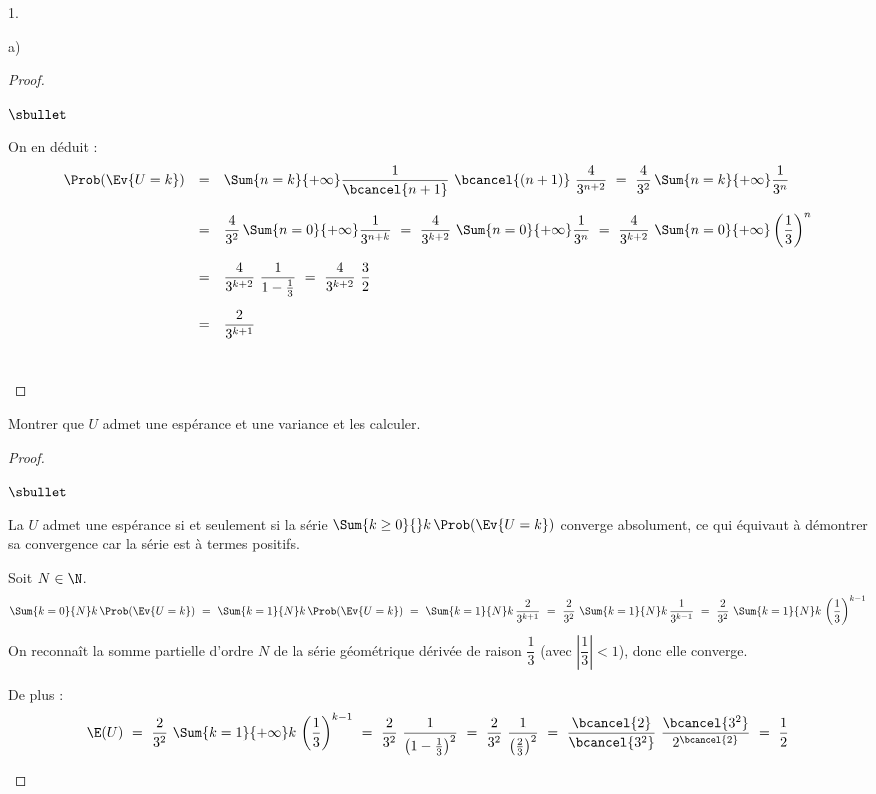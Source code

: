 \begin{noliste}{1.}
\begin{noliste}{a)}
\begin{proof}
\begin{noliste}{$\sbullet$}
      
      On en déduit :
      \[
       \begin{array}{rcl}
        \Prob(\Ev{U=k}) & = &  \Sum{n=k}{+\infty} \dfrac{1}{\bcancel{n+1}}
        \ \bcancel{(n+1)} \ \dfrac{4}{3^{n+2}}
        \ = \ \dfrac{4}{3^2} \, \Sum{n=k}{+\infty} \dfrac{1}{3^n}
        \\[.6cm]
        & = &  \dfrac{4}{3^2} \, \Sum{n=0}{+\infty} \dfrac{1}{3^{n+k}}
        \ = \ \dfrac{4}{3^{k+2}} \ \Sum{n=0}{+\infty}
        \dfrac{1}{3^n}
        \ = \ \dfrac{4}{3^{k+2}} \ \Sum{n=0}{+\infty} \left(
        \dfrac{1}{3}\right)^n
        \\[.6cm]
        & = &  \dfrac{4}{3^{k+2}} \ \dfrac{1}{1- \frac{1}{3}} \ = \
        \dfrac{4}{3^{k+2}} \ \dfrac{3}{2}
        \\[.6cm]
        & = &  \dfrac{2}{3^{k+1}}
       \end{array}
      \]
      ~\\[-1.2cm]
     \end{noliste}
    \end{proof}
    
    \item Montrer que $U$ admet une espérance et une variance et les 
    calculer.
    
    \begin{proof}~
      \begin{noliste}{$\sbullet$}
	\item La \var $U$ admet une espérance si et seulement si la 
	série $\Sum{k\geq 0}{} k \, \Prob(\Ev{U=k})$ converge 
	absolument,
	ce qui équivaut à démontrer sa convergence car la série est 
	à termes positifs.
	
	\item Soit $N\in \N$.
	\[
	  \Sum{k=0}{N} k \, \Prob(\Ev{U=k}) \ = \
	  \Sum{k=1}{N} k \, \Prob(\Ev{U=k}) \ = \
	  \Sum{k=1}{N} k \, \dfrac{2}{3^{k+1}} \ = \
	  \dfrac{2}{3^2} \ \Sum{k=1}{N} k \, \dfrac{1}{3^{k-1}} \ = \
	  \dfrac{2}{3^2} \ \Sum{k=1}{N} k \, \left( \dfrac{1}{3}
	  \right)^{k-1}
	\]
	On reconnaît la somme partielle d'ordre $N$ de la série 
	géométrique dérivée de raison $\dfrac{1}{3}$ (avec $\left\vert 
	\dfrac{1}{3} \right\vert <1$), donc elle converge.
	
	De plus :
	\[
	  \E(U) \ = \
	  \dfrac{2}{3^2} \ \Sum{k=1}{+\infty} k \, \left(\dfrac{1}{3}
	  \right)^{k-1} 
	  \ = \ \dfrac{2}{3^2} \ \dfrac{1}{\big(1-\frac{1}{3}\big)^2}
	  \ = \ \dfrac{2}{3^2} \ \dfrac{1}{\big( \frac{2}{3}\big)^2}
	  \ = \ \dfrac{\bcancel{2}}{\bcancel{3^2}} \ 
	  \dfrac{\bcancel{3^2}}{2^{\bcancel{2}}} \ = \ \dfrac{1}{2}
	\]
	\conc{$\E(U) = \dfrac{1}{2}$}
	

\end{noliste}
\end{proof}
\end{noliste}
\end{noliste}
